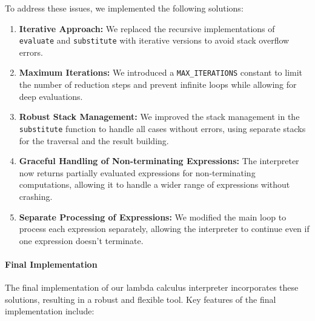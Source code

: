 To address these issues, we implemented the following solutions:

\begin{enumerate}
    \item \textbf{Iterative Approach:} We replaced the recursive implementations of \texttt{evaluate} and \texttt{substitute} with iterative versions to avoid stack overflow errors.
    \item \textbf{Maximum Iterations:} We introduced a \texttt{MAX\_ITERATIONS} constant to limit the number of reduction steps and prevent infinite loops while allowing for deep evaluations.
    \item \textbf{Robust Stack Management:} We improved the stack management in the \texttt{substitute} function to handle all cases without errors, using separate stacks for the traversal and the result building.
    \item \textbf{Graceful Handling of Non-terminating Expressions:} The interpreter now returns partially evaluated expressions for non-terminating computations, allowing it to handle a wider range of expressions without crashing.
    \item \textbf{Separate Processing of Expressions:} We modified the main loop to process each expression separately, allowing the interpreter to continue even if one expression doesn't terminate.
\end{enumerate}

\paragraph{Final Implementation}

The final implementation of our lambda calculus interpreter incorporates these solutions, resulting in a robust and flexible tool. Key features of the final implementation include:

